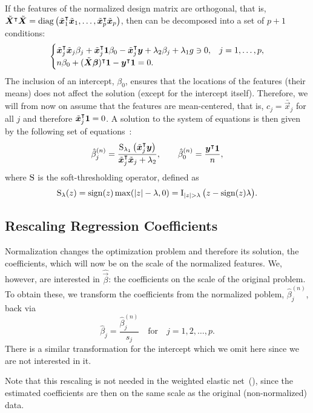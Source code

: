 If the features of the normalized design matrix are orthogonal, that is,
\(\tilde{\boldsymbol{X}}^\intercal \tilde{\boldsymbol{X}} = \operatorname{diag}\left(\tilde{\boldsymbol{x}}_1^\intercal
\tilde{\boldsymbol{x}}_1, \dots, \tilde{\boldsymbol{x}}_p^\intercal \tilde{\boldsymbol{x}}_p\right) \), then
 can be decomposed into a set of \(p + 1\) conditions:
%
\[
  \begin{cases}
    \tilde{\boldsymbol{x}}_j^\intercal \tilde{\boldsymbol{x}}_j \beta_j + \tilde{\boldsymbol{x}}_j^\intercal \boldsymbol{1} \beta_0 - \tilde{\boldsymbol{x}}_j^\intercal\boldsymbol{y} + \lambda_2 \beta_j + \lambda_1 g \ni 0, & j=1,\dots,p, \\
    n \beta_0 + (\tilde{\boldsymbol{X}}\boldsymbol{\beta})^\intercal \boldsymbol{1} -  \boldsymbol{y}^\intercal \boldsymbol{1} = 0.
  \end{cases}
\]
%
The inclusion of an intercept, \(\beta_0\), ensures that the locations of the features
(their means) does not affect the solution (except for the intercept itself). Therefore, we
will from now on assume that the features are mean-centered, that is, \(c_j =
\bar{\vec{x}}_j\) for all \(j\) and therefore \(\tilde{\boldsymbol{x}}_j^\intercal \boldsymbol{1} = 0\). A
solution to the system of equations is then given by the following set of
equations~\citep{donoho1994}:
\begin{equation*}
  \label{eq:orthogonal-solution-normalized}
  \hat{\beta}^{(n)}_j = \frac{\operatorname{S}_{\lambda_1}\left(\tilde{\boldsymbol{x}}_j^\intercal \boldsymbol{y}\right)}{\tilde{\boldsymbol{x}}_j^\intercal \tilde{\boldsymbol{x}}_j + \lambda_2},
  \qquad
  \hat{\beta}_0^{(n)} = \frac{\boldsymbol{y}^\intercal \boldsymbol{1}}{n},
\end{equation*}
where \(\operatorname{S}\) is the soft-thresholding operator, defined as
\[
  \st_\lambda(z) = \sign(z) \max(|z| - \lambda, 0) = \ind{|z|>\lambda}\big(z - \sign(z)\lambda\big).
\]

\subsection{Rescaling Regression Coefficients}

Normalization changes the optimization problem and therefore its solution, the
coefficients, which will now be on the scale of the normalized features. We, however, are
interested in \(\hat{\vec{\beta}}\): the coefficients on the scale of the original problem.
To obtain these, we transform the coefficients from the normalized poblem,
\(\hat\beta^{(n)}_j\), back via
%
\begin{equation}
  \label{eq:orthogonal-solution}
  \hat\beta_j = \frac{\hat\beta^{(n)}_j}{s_j} \quad\text{for}\quad j = 1,2,\dots,p.
\end{equation}
%
There is a similar transformation for the intercept which we omit here since we are not
interested in it.

Note that this rescaling is not needed in the weighted elastic
net~(), since the estimated coefficients are then on the same
scale as the original (non-normalized) data.
